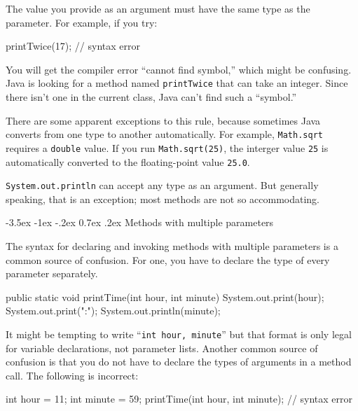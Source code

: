 \documentclass[12pt]{book}
\makeatletter
\theoremstyle{exercise}
\newcommand{\java}[1]{\verb"#1"}
\renewcommand{\section}{\@startsection{section}{1}{\z@}%
    {-3.5ex \@plus -1ex \@minus -.2ex}%
    {0.7ex \@plus.2ex}%
    {\normalfont\Large\bfseries}}
\newcommand{\java}[1]{\lstinline{#1}} %
\makeatother
\begin{document}
The value you provide as an argument must have the same type as the parameter.
For example, if you try:

\begin{code}
    printTwice(17);  // syntax error
\end{code}

You will get the compiler error ``cannot find symbol,'' which might be confusing.
Java is looking for a method named \java{printTwice} that can take an integer.
Since there isn't one in the current class, Java can't find such a ``symbol.''

There are some apparent exceptions to this rule, because sometimes Java converts from one type to another automatically.
For example, \java{Math.sqrt} requires a \java{double} value.
If you run \java{Math.sqrt(25)}, the interger value \java{25} is automatically converted to the floating-point value \java{25.0}.

\java{System.out.println} can accept any type as an argument.
But generally speaking, that is an exception; most methods are not so accommodating.


\section{Methods with multiple parameters}
\label{time}


The syntax for declaring and invoking methods with multiple parameters is a common source of confusion.
For one, you have to declare the type of every parameter separately.

\begin{code}
    public static void printTime(int hour, int minute) {
        System.out.print(hour);
        System.out.print(":");
        System.out.println(minute);
    }
\end{code}

It might be tempting to write ``\java{int hour, minute}'' but that format is only legal for variable declarations, not parameter lists.
Another common source of confusion is that you do not have to declare the types of arguments in a method call.
The following is incorrect:

\begin{code}
    int hour = 11;
    int minute = 59;
    printTime(int hour, int minute);  // syntax error
\end{code}
\end{document}
